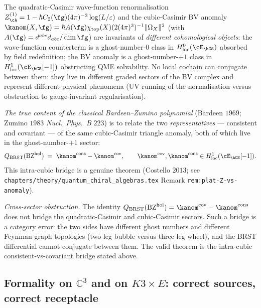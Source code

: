 \begin{theorem}
\label{wn:thm:second-pass-BZ-category}

The quadratic-Casimir wave-function renormalisation
$Z^{(1)}_{\cA} = 1 - \hbar C_2(\fg)(4\pi)^{-3}\log(L/\varepsilon)$
and the cubic-Casimir BV anomaly
$\kanom(X, \fg) = \hbar A(\fg)\chi_{\mathrm{top}}(X)(2(4\pi)^3)^{-1}
\|\Omega_X\|^2$
(with $A(\fg) = d^{abc}d_{abc}/\dim\fg$) are invariants of
\emph{different cohomological objects}:
the wave-function counterterm is a ghost-number-$0$ class in
$H^0_{\mathrm{loc}}(\cE_{\hCS})$ absorbed by field redefinition;
the BV anomaly is a ghost-number-$+1$ class in
$H^1_{\mathrm{loc}}(\cE_{\hCS}[-1])$ obstructing QME solvability.
No local cochain can conjugate between them: they live in different
graded sectors of the BV complex and represent different physical
phenomena (UV running of the normalisation versus obstruction to
gauge-invariant regularisation).

\emph{The true content of the classical Bardeen--Zumino polynomial}
(Bardeen $1969$; Zumino $1983$ \emph{Nucl.~Phys.~B} $223$) is to relate
the two \emph{representatives} --- consistent and covariant --- of the
same cubic-Casimir triangle anomaly, both of which live in the
ghost-number-$+1$ sector:
\[
Q_{\mathrm{BRST}}(\mathrm{BZ}^{\mathrm{hol}}) \;=\;
\kanom^{\mathrm{cons}} - \kanom^{\mathrm{cov}},
\qquad
\kanom^{\mathrm{cov}}, \kanom^{\mathrm{cons}} \in
H^1_{\mathrm{loc}}(\cE_{\hCS}[-1]).
\]
This intra-cubic bridge is a genuine theorem (Costello $2013$; see
\texttt{chapters/theory/quantum\_chiral\_algebras.tex} Remark
\texttt{rem:plat-Z-vs-anomaly}).

\emph{Cross-sector obstruction.} The identity
$Q_{\mathrm{BRST}}(\mathrm{BZ}^{\mathrm{hol}}) =
\kanom^{\mathrm{cov}} - \kanom^{\mathrm{cons}}$
does not bridge the quadratic-Casimir and cubic-Casimir sectors. Such a
bridge is a category error: the two sides have different ghost numbers and
different Feynman-graph topologies (two-leg bubble versus three-leg
wheel), and the BRST differential cannot conjugate between them. The
valid theorem is the intra-cubic consistent-vs-covariant bridge stated
above.
\end{theorem}

\subsection{Formality on $\mathbb{C}^3$ and on $K3 \times E$: correct
sources, correct receptacle}
\label{wn:subsec:second-pass-formality}

